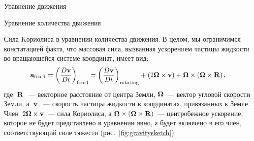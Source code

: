 \begin{chapter}{Уравнение движения}
\begin{section}{Уравнение количества движения}
\begin{paragraph}{Сила Kориолиса в уравнении количества движения.}
В целом, мы ограничимся констатацией факта, что массовая сила, вызванная 
ускорением частицы жидкости во вращающейся системе координат, имеет вид:
\begin{equation}
\mathbf{a}_{\text{fixed}} = \left(\frac{D\mathbf{v}}{Dt}\right)_{\text{fixed}} 
 = \left(\frac{D\mathbf{v}}{Dt}\right)_{\text{rotating}} 
   + \left( 2 \boldsymbol{\Omega} \times \mathbf{v} \right) 
   + \boldsymbol{\Omega} \times \left(\boldsymbol{\Omega} \times \mathbf{R} \right),
\end{equation}
где $\mbfR$~--- векторное расстояние от центра Земли, 
$\boldsymbol{\Omega}$~--- вектор угловой скорости Земли, а
$\mbfv$~--- скорость частицы жидкости в координатах, привязанных к Земле.
Член~$2 \boldsymbol{\Omega} \times \mathbf{v}$~--- сила Кориолиса, 
а $\boldsymbol{\Omega} \times \left(\boldsymbol{\Omega} \times \mathbf{R} \right)$~--- центробежное 
ускорение, которое не будет представлено в уравнении явно, а будет включено
в его член, соответствующий силе тяжести (рис.~\ref{fig:gravitysketch}).
%
\end{paragraph}


\end{section}
\end{chapter}
